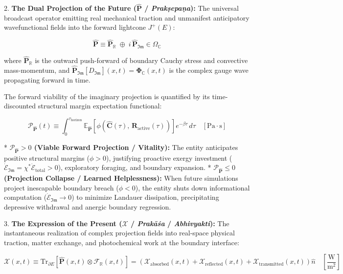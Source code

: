 \documentclass[11pt,a4paper]{article}
\theoremstyle{definition}
\theoremstyle{remark}
\begin{document}
2. \textbf{The Dual Projection of the Future ($\hat{\mathbf{P}}$ / \textit{Prakṣepaṇa}):}  
   The universal broadcast operator emitting real mechanical traction and unmanifest anticipatory wavefunctional fields into the forward lightcone $J^+(E)$:
   
\begin{equation}
\boxed{\hat{\mathbf{P}} \equiv \hat{\mathbf{P}}_{\mathbb{R}} \;\oplus\; i \, \hat{\mathbf{P}}_{\mathfrak{Im}} \in \Omega_{\mathbb{C}}}
\end{equation}

   where $\hat{\mathbf{P}}_{\mathbb{R}}$ is the outward push-forward of boundary Cauchy stress and convective mass-momentum, and $\hat{\mathbf{P}}_{\mathfrak{Im}}[D_{\mathfrak{Im}}](x, t) = \mathbf{\Phi}_{\mathbb{C}}(x, t)$ is the complex gauge wave propagating forward in time.
   
   The forward viability of the imaginary projection is quantified by its time-discounted structural margin expectation functional:
   
\begin{equation}
\mathcal{P}_{\hat{\mathbf{P}}}(t) \equiv \int_0^{\tau_{\text{horizon}}} \mathbb{E}_{\hat{\mathbf{P}}}[ \phi\left( \hat{\mathbf{C}}(\tau), \, \mathbf{R}_{\text{active}}(\tau) \right) ] e^{-\beta \tau} \, d\tau \quad [\mathrm{Pa \cdot s}]
\end{equation}

   * \textbf{$\mathcal{P}_{\hat{\mathbf{P}}} > 0$ (Viable Forward Projection / Vitality):} The entity anticipates positive structural margins ($\phi > 0$), justifying proactive exergy investment ($\dot{\mathcal{E}}_{\mathfrak{Im}} = \chi^* \dot{\mathcal{E}}_{\text{total}} > 0$), exploratory foraging, and boundary expansion.
   * \textbf{$\mathcal{P}_{\hat{\mathbf{P}}} \le 0$ (Projection Collapse / Learned Helplessness):} When future simulations project inescapable boundary breach ($\phi < 0$), the entity shuts down informational computation ($\dot{\mathcal{E}}_{\mathfrak{Im}} \to 0$) to minimize Landauer dissipation, precipitating depressive withdrawal and anergic boundary regression.

3. \textbf{The Expression of the Present ($\boldsymbol{\mathcal{X}}$ / \textit{Prakāśa} / \textit{Abhivyakti}):}  
   The instantaneous realization of complex projection fields into real-space physical traction, matter exchange, and photochemical work at the boundary interface:
   
\begin{equation}
\boxed{\boldsymbol{\mathcal{X}}(x, t) \equiv \mathrm{Tr}_{\partial E}[ \hat{\mathbf{P}}(x, t) \otimes \mathcal{F}_{\mathbb{R}}(x, t) ] = \left( \mathcal{X}_{\text{absorbed}}(x, t) + \mathcal{X}_{\text{reflected}}(x, t) + \mathcal{X}_{\text{transmitted}}(x, t) \right) \hat{n} \quad [\frac{\mathrm{W}}{\mathrm{m^2}}]}
\end{equation}
\end{document}
